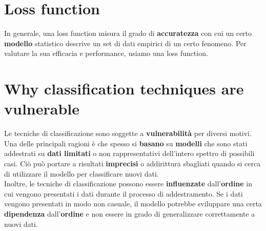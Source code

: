 \documentclass{article}
\begin{document}
\section{Loss function}
In generale, una loss function misura il grado di \textbf{accuratezza} con cui un certo \textbf{modello} statistico descrive un set di dati empirici di un certo fenomeno. Per valutare la sua efficacia e performance, usiamo una loss function.

\section{Why classification techniques are vulnerable}
Le tecniche di classificazione sono soggette a \textbf{vulnerabilità} per diversi motivi. Una delle principali ragioni è che spesso si \textbf{basano} su \textbf{modelli} che sono stati addestrati su \textbf{dati limitati} o non rappresentativi dell'intero spettro di possibili casi. Ciò può portare a risultati \textbf{imprecisi} o addirittura sbagliati quando si cerca di utilizzare il modello per classificare nuovi dati.
\\
Inoltre, le tecniche di classificazione possono essere \textbf{influenzate} dall'\textbf{ordine} in cui vengono presentati i dati durante il processo di addestramento. Se i dati vengono presentati in modo non casuale, il modello potrebbe sviluppare una certa \textbf{dipendenza} dall'\textbf{ordine} e non essere in grado di generalizzare correttamente a nuovi dati.
\end{document}
